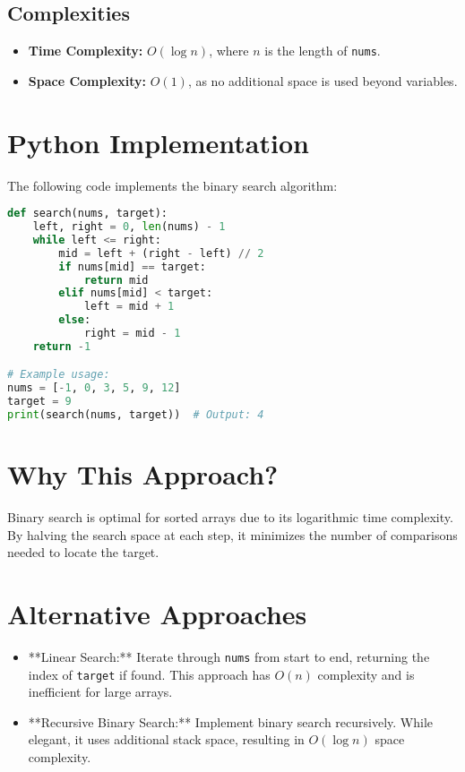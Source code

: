 \subsection*{Complexities}
\begin{itemize}
    \item \textbf{Time Complexity:} \( O(\log n) \), where \( n \) is the length of \texttt{nums}.
    \item \textbf{Space Complexity:} \( O(1) \), as no additional space is used beyond variables.
\end{itemize}

\section*{Python Implementation}
The following code implements the binary search algorithm:

\begin{fullwidth}
\begin{lstlisting}[language=Python]
def search(nums, target):
    left, right = 0, len(nums) - 1
    while left <= right:
        mid = left + (right - left) // 2
        if nums[mid] == target:
            return mid
        elif nums[mid] < target:
            left = mid + 1
        else:
            right = mid - 1
    return -1

# Example usage:
nums = [-1, 0, 3, 5, 9, 12]
target = 9
print(search(nums, target))  # Output: 4
\end{lstlisting}
\end{fullwidth}

\section*{Why This Approach?}
Binary search is optimal for sorted arrays due to its logarithmic time complexity. By halving the search space at each step, it minimizes the number of comparisons needed to locate the target.

\section*{Alternative Approaches}
\begin{itemize}
    \item **Linear Search:** Iterate through \texttt{nums} from start to end, returning the index of \texttt{target} if found. This approach has \( O(n) \) complexity and is inefficient for large arrays.
    \item **Recursive Binary Search:** Implement binary search recursively. While elegant, it uses additional stack space, resulting in \( O(\log n) \) space complexity.
\end{itemize}

